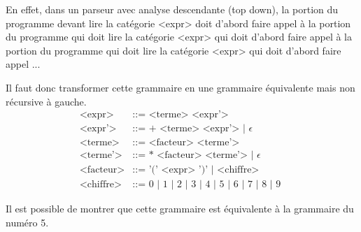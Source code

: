 \begin{Exercise}[title={Grammaire pour l'addition et la multiplication}]
En effet, dans un parseur avec analyse descendante (top down), la
portion du programme devant lire la catégorie <expr> doit d'abord faire
appel à la portion du programme qui doit lire la catégorie <expr> qui doit
d'abord faire appel à la portion du programme qui doit lire la catégorie
<expr> qui doit d'abord faire appel ...

Il faut donc transformer cette grammaire en une grammaire équivalente
mais non récursive à gauche.
\begin{align*}
  \text{<expr>}  &\text{::=  <terme> <expr'>} \\
  \text{<expr'>}  &\text{::=  + <terme> <expr'> | } \epsilon \\
  \text{<terme>} &\text{::=  <facteur> <terme'>} \\
  \text{<terme'>} &\text{::=  * <facteur> <terme'> | } \epsilon \\
  \text{<facteur>} &\text{::= '(' <expr> ')' | <chiffre>} \\
  \text{<chiffre>}  &\text{::=  0 | 1 | 2 | 3 | 4 | 5 | 6 | 7 | 8 | 9 }
\end{align*}

Il est possible de montrer que cette grammaire est équivalente à la
grammaire du numéro 5.
\end{Exercise}
